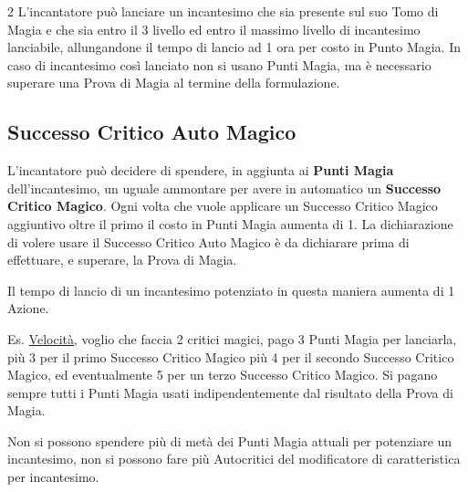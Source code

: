 \begin{multicols}{2}
L'incantatore può lanciare un incantesimo che sia presente sul suo Tomo di Magia e che sia entro il 3 livello ed entro il massimo livello di incantesimo lanciabile, allungandone il tempo di lancio ad 1 ora per costo in Punto Magia. In caso di incantesimo così lanciato non si usano Punti Magia, ma è necessario superare una Prova di Magia al termine della formulazione.


\subsection{Successo Critico Auto Magico}\label{magienova}

L'incantatore può decidere di spendere, in aggiunta ai \textbf{Punti Magia} dell'incantesimo, un uguale ammontare per avere in automatico un \textbf{Successo Critico Magico}.
Ogni volta che vuole applicare un Successo Critico Magico aggiuntivo oltre il primo il costo in Punti Magia aumenta di 1. La dichiarazione di volere usare il Successo Critico Auto Magico è da dichiarare prima di effettuare, e superare, la Prova di Magia.



%

Il tempo di lancio di un incantesimo potenziato in questa maniera aumenta di 1 Azione.

Es. \hyperlink{Velocità}{Velocità}, voglio che faccia 2 critici magici, pago 3 Punti Magia per lanciarla, più 3 per il primo Successo Critico Magico più 4 per il secondo Successo Critico Magico, ed eventualmente 5 per un terzo Successo Critico Magico. Si pagano sempre tutti i Punti Magia usati indipendentemente dal risultato della Prova di Magia.

Non si possono spendere più di metà dei Punti Magia attuali per potenziare un incantesimo, non si possono fare più Autocritici del modificatore di caratteristica per incantesimo.


\end{multicols}
